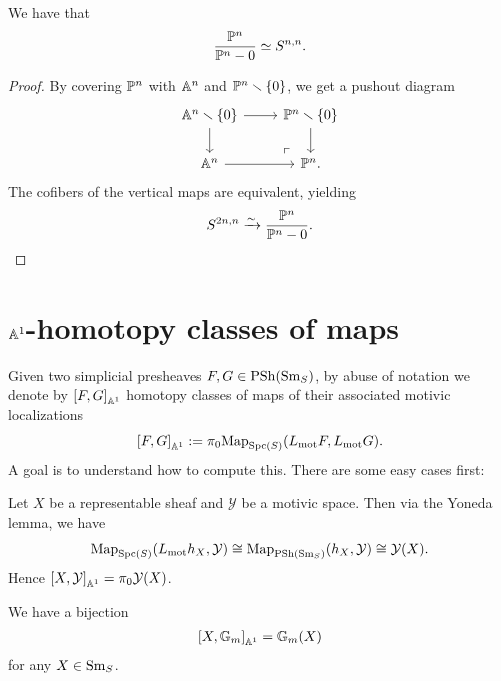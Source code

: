 \documentclass[11pt,openany]{book}
\renewcommand{\Pre}{\mathrm{PSh}}
\begin{document}
\begin{proposition} We have that
\begin{align*}
    \frac{\P^n}{\P^n-0}\simeq S^{n,n}.
\end{align*}
\end{proposition}
\begin{proof} By covering $\P^n$ with $\A^n$ and $\P^n\minus\left\{ 0 \right\}$, we get a pushout diagram
\[ \begin{tikzcd}
    \A^n\minus \left\{ 0 \right\}\rar\dar & \P^n\minus\left\{ 0 \right\}\dar\\
    \A^n\rar & \P^n.\po
\end{tikzcd} \]
The cofibers of the vertical maps are equivalent, yielding
\begin{align*}
    S^{2n,n} \xto{\sim} \frac{\P^n}{\P^n-0}.
\end{align*}
\end{proof}



\section{$\A^1$-homotopy classes of maps}

Given two simplicial presheaves $F,G \in \PSh(\Sm_S)$, by abuse of notation we denote by $\left[ F,G \right]_{\A^1}$ homotopy classes of maps of their associated motivic localizations
\begin{align*}
    \left[ F,G \right]_{\A^1} := \pi_0 \Map_{\Spc(S)} (L_\mot F, L_\mot G).
\end{align*}
%
A goal is to understand how to compute this. There are some easy cases first:

\begin{example} Let $X$ be a representable sheaf and $\mathcal{Y}$ be a motivic space. Then via the Yoneda lemma, we have
\begin{align*}
    \Map_{\Spc(S)}(L_\mot h_X, \mathcal{Y}) \cong \Map_{\Pre(\Sm_S)} (h_X, \mathcal{Y}) \cong \mathcal{Y}(X).
\end{align*}
Hence $\left[ X,\mathcal{Y} \right]_{\A^1} = \pi_0 \mathcal{Y}(X)$.
\end{example}

\begin{example} We have a bijection
\begin{align*}
    \left[ X, \mathbb{G}_m \right]_{\A^1} = \mathbb{G}_m(X)
\end{align*}
for any $X\in \Sm_S$.
\end{example}
\end{document}
